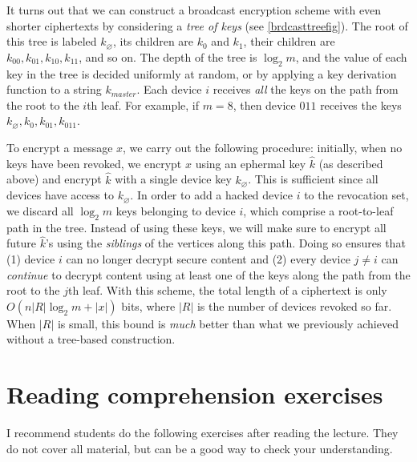 It turns out that we can construct a broadcast encryption scheme with
even shorter ciphertexts by considering a \emph{tree of keys} (see
\cref{brdcasttreefig}). The root of this tree is labeled
\(k_{\varnothing}\), its children are \(k_0\) and \(k_1\), their
children are \(k_{00}, k_{01}, k_{10}, k_{11}\), and so on. The depth of
the tree is \(\log_2 m\), and the value of each key in the tree is
decided uniformly at random, or by applying a key derivation function to
a string \(k_{master}\). Each device \(i\) receives \emph{all} the keys
on the path from the root to the \(i\)th leaf. For example, if \(m=8\),
then device \(011\) receives the keys
\(k_{\varnothing}, k_0, k_{01}, k_{011}\).

To encrypt a message \(x\), we carry out the following procedure:
initially, when no keys have been revoked, we encrypt \(x\) using an
ephermal key \(\hat k\) (as described above) and encrypt \(\hat k\) with
a single device key \(k_\varnothing\). This is sufficient since all
devices have access to \(k_\varnothing\). In order to add a hacked
device \(i\) to the revocation set, we discard all \(\log_2 m\) keys
belonging to device \(i\), which comprise a root-to-leaf path in the
tree. Instead of using these keys, we will make sure to encrypt all
future \(\hat k\)'s using the \emph{siblings} of the vertices along this
path. Doing so ensures that (1) device \(i\) can no longer decrypt
secure content and (2) every device \(j \neq i\) can \emph{continue} to
decrypt content using at least one of the keys along the path from the
root to the \(j\)th leaf. With this scheme, the total length of a
ciphertext is only \(O(n|R| \log_2 m + |x|)\) bits, where \(|R|\) is the
number of devices revoked so far. When \(|R|\) is small, this bound is
\emph{much} better than what we previously achieved without a tree-based
construction.

\section{Reading comprehension
exercises}\label{5-Reading-comprehension-}

I recommend students do the following exercises after reading the
lecture. They do not cover all material, but can be a good way to check
your understanding.


